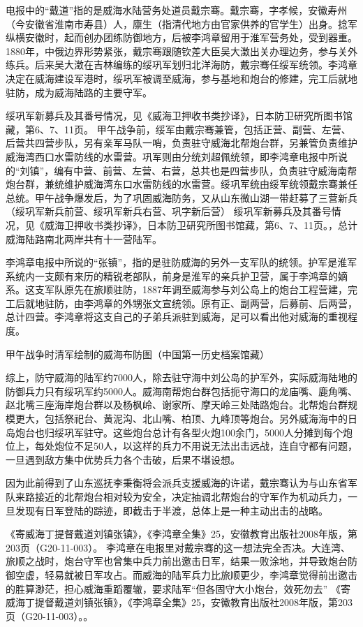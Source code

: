 \documentclass[12pt,UTF8]{ctexbook}
\begin{document}
电报中的“戴道”指的是威海水陆营务处道员戴宗骞。戴宗骞，字孝候，安徽寿州（今安徽省淮南市寿县）人，廪生（指清代地方由官家供养的官学生）出身。捻军纵横安徽时，起而创办团练防御地方，后被李鸿章留用于淮军营务处，受到器重。1880年，中俄边界形势紧张，戴宗骞跟随钦差大臣吴大澂出关办理边务，参与关外练兵。后来吴大澂在吉林编练的绥巩军划归北洋海防，戴宗骞任绥军统领。李鸿章决定在威海建设军港时，绥巩军被调至威海，参与基地和炮台的修建，完工后就地驻防，成为威海陆路的主要守军。

绥巩军新募兵及其番号情况，见《威海卫押收书类抄译》，日本防卫研究所图书馆藏，第6、7、11页。
甲午战争前，绥军由戴宗骞兼管，包括正营、副营、左营、后营共四营步队，另有亲军马队一哨，负责驻守威海北帮炮台群，另兼管负责维护威海湾西口水雷防线的水雷营。巩军则由分统刘超佩统领，即李鸿章电报中所说的“刘镇”，编有中营、前营、左营、右营，总共也是四营步队，负责驻守威海南帮炮台群，兼统维护威海湾东口水雷防线的水雷营。绥巩军统由绥军统领戴宗骞兼任总统。甲午战争爆发后，为了巩固威海防务，又从山东微山湖一带赶募了三营新兵（绥巩军新兵前营、绥巩军新兵右营、巩字新后营） 绥巩军新募兵及其番号情况，见《威海卫押收书类抄译》，日本防卫研究所图书馆藏，第6、7、11页。，总计威海陆路南北两岸共有十一营陆军。

李鸿章电报中所说的“张镇”，指的是驻防威海的另外一支军队的统领。护军是淮军系统内一支颇有来历的精锐老部队，前身是淮军的亲兵护卫营，属于李鸿章的嫡系。这支军队原先在旅顺驻防，1887年调至威海参与刘公岛上的炮台工程营建，完工后就地驻防，由李鸿章的外甥张文宣统领。原有正、副两营，后募前、后两营，总计四营。李鸿章将这支自己的子弟兵派驻到威海，足可以看出他对威海的重视程度。


甲午战争时清军绘制的威海布防图（中国第一历史档案馆藏）

综上，防守威海的陆军约7000人，除去驻守海中刘公岛的护军外，实际威海陆地的防御兵力只有绥巩军约5000人。威海南帮炮台群包括扼守海口的龙庙嘴、鹿角嘴、赵北嘴三座海岸炮台群以及杨枫岭、谢家所、摩天岭三处陆路炮台。北帮炮台群规模更大，包括祭祀台、黄泥沟、北山嘴、柏顶、九峰顶等炮台。另外威海海中的日岛炮台也归绥巩军驻守。这些炮台总计有各型火炮100余门，5000人分摊到每个炮位上，每处炮位不足50人，以这样的兵力不用说无法出击远战，连自守都有问题，一旦遇到敌方集中优势兵力各个击破，后果不堪设想。

因为此前得到了山东巡抚李秉衡将会派兵支援威海的许诺，戴宗骞认为与山东省军队来路接近的北帮炮台相对较为安全，决定抽调北帮炮台的守军作为机动兵力，一旦发现有日军登陆的踪迹，即截击于半渡，总体上是一种主动出击的战略。

《寄威海丁提督戴道刘镇张镇》，《李鸿章全集》25，安徽教育出版社2008年版，第203页（G20-11-003）。
李鸿章在电报里对戴宗骞的这一想法完全否决。大连湾、旅顺之战时，炮台守军也曾集中兵力前出邀击日军，结果一败涂地，并导致炮台防御空虚，轻易就被日军攻占。而威海的陆军兵力比旅顺更少，李鸿章觉得前出邀击的胜算渺茫，担心威海重蹈覆辙，要求陆军“但各固守大小炮台，效死勿去” 《寄威海丁提督戴道刘镇张镇》，《李鸿章全集》25，安徽教育出版社2008年版，第203页（G20-11-003）。。
\end{document}
